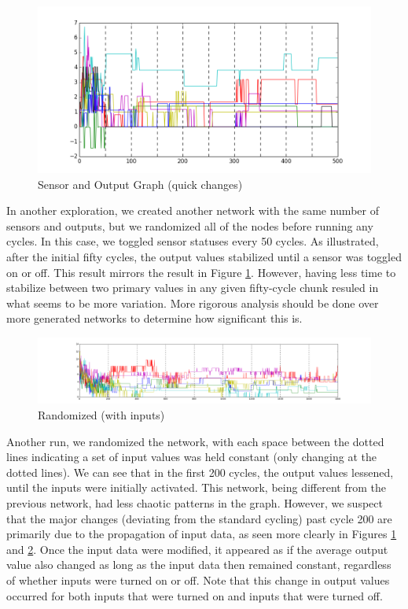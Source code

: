 \documentclass[12pt]{article}
\begin{document}
\begin{figure}[H]
    \centering
    \includegraphics[width=\linewidth]{../visualizations/8knodes_quick_changes.png}
    \caption{Sensor and Output Graph (quick changes)}
    \label{fig:unprimed_sensoroutput_quick_graph}
\end{figure}

In another exploration, we created another network with the same number of sensors and outputs, but we randomized all of the nodes before running any cycles.  In this case, we toggled sensor statuses every 50 cycles.  As illustrated, after the initial fifty cycles, the output values stabilized until a sensor was toggled on or off.  This result mirrors the result in Figure \ref{fig:unprimed_sensoroutput_quick_graph}.  However, having less time to stabilize between two primary values in any given fifty-cycle chunk resuled in what seems to be more variation.  More rigorous analysis should be done over more generated networks to determine how significant this is.

\begin{figure}[H]
    \includegraphics[width=\linewidth]{../visualizations/8knodes_sensors_lineannotated.png}
    \caption{Randomized (with inputs)}
    \label{fig:unprimed_sensoroutput_graph}
\end{figure}

Another run, we randomized the network, with each space between the dotted lines indicating a set of input values was held constant (only changing at the dotted lines).  We can see that in the first 200 cycles, the output values lessened, until the inputs were initially activated.  This network, being different from the previous network, had less chaotic patterns in the graph.  However, we suspect that the major changes (deviating from the standard cycling) past cycle 200 are primarily due to the propagation of input data, as seen more clearly in Figures \ref{fig:unprimed_sensoroutput_quick_graph} and \ref{fig:unprimed_sensoroutput_graph}.  Once the input data were modified, it appeared as if the average output value also changed as long as the input data then remained constant, regardless of whether inputs were turned on or off.  Note that this change in output values occurred for both inputs that were turned on and inputs that were turned off.
\end{document}
